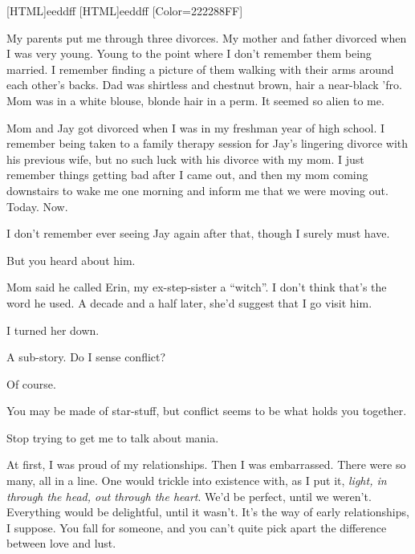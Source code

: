 \label{poly}
[HTML]{eeddff}
[HTML]{eeddff}
\renewfontfamily{}[Color=222288FF] %
\begin{paracol}{2}
\begin{leftcolumn}

\noindent My parents put me through three divorces. My mother and father divorced when I was very young. Young to the point where I don't remember them being married. I remember finding a picture of them walking with their arms around each other's backs. Dad was shirtless and chestnut brown, hair a near-black 'fro. Mom was in a white blouse, blonde hair in a perm. It seemed so alien to me.

Mom and Jay got divorced when I was in my freshman year of high school. I remember being taken to a family therapy session for Jay's lingering divorce with his previous wife, but no such luck with his divorce with my mom. I just remember things getting bad after I came out, and then my mom coming downstairs to wake me one morning and inform me that we were moving out. Today. Now.

\end{leftcolumn}
\begin{rightcolumn*}
  
\end{rightcolumn*}
\begin{leftcolumn}

I don't remember ever seeing Jay again after that, though I surely must have.

\begin{ally}
But you heard about him.
\end{ally}
Mom said he called Erin, my ex-step-sister a ``witch''. I don't think that's the word he used. A decade and a half later, she'd suggest that I go visit him.

I turned her down.

\begin{ally}
A sub-story. Do I sense conflict?
\end{ally}
Of course.

\begin{ally}
You may be made of star-stuff, but conflict seems to be what holds you together.
\end{ally}
Stop trying to get me to talk about mania.

At first, I was proud of my relationships. Then I was embarrassed. There were so many, all in a line. One would trickle into existence with, as I put it, \emph{light, in through the head, out through the heart}. We'd be perfect, until we weren't. Everything would be delightful, until it wasn't. It's the way of early relationships, I suppose. You fall for someone, and you can't quite pick apart the difference between love and lust.


\end{leftcolumn}
\end{paracol}

